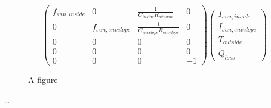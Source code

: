 \begin{landscape}
\begin{equation*}
\begin{pmatrix}
         f_{sun,inside} & 0 & \frac{1}{C_{inside}R_{window}} & 0\\
         0 & f_{sun,envelope} & \frac{1}{C_{envelope}R_{envelope}}&0\\
         0 & 0 & 0& 0\\
         0 & 0 & 0& 0\\
         0 & 0 & 0 & -1
    \end{pmatrix}
	\left(\begin{array}{c} I_{sun,inside}\\ I_{sun,envelope}\\ T_{outside} \\ \dot{Q}_{loss} \end{array}\right)
	\end{equation*}	
	
\end{landscape}


\setcounter{figure}{0}
		
\begin{figure} [ht]
  \centering
  \caption{A figure}
  \label{fig:anotherfigure}
\end{figure}


\dots